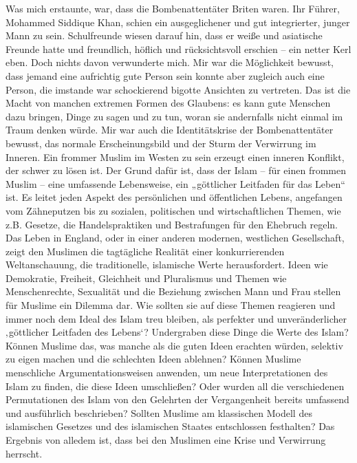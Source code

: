 \documentclass[12pt]{memoir}
\begin{document}
Was mich erstaunte, war, dass die Bombenattentäter Briten waren.
Ihr Führer, Mohammed Siddique Khan,
schien ein ausgeglichener und gut integrierter, junger Mann zu sein.
Schulfreunde wiesen darauf hin, dass er weiße und asiatische Freunde hatte
und freundlich, höflich und rücksichtsvoll erschien – ein netter Kerl eben.
Doch nichts davon verwunderte mich.
Mir war die Möglichkeit bewusst,
dass jemand eine aufrichtig gute Person sein konnte
aber zugleich auch eine Person,
die imstande war schockierend bigotte Ansichten zu vertreten.
Das ist die Macht von manchen extremen Formen des Glaubens:
es kann gute Menschen dazu bringen, Dinge zu sagen und zu tun,
woran sie andernfalls nicht einmal im Traum denken würde.
Mir war auch die Identitätskrise der Bombenattentäter bewusst,
das normale Erscheinungsbild und der Sturm der Verwirrung im Inneren.
Ein frommer Muslim im Westen zu sein erzeugt einen inneren Konflikt,
der schwer zu lösen ist.
Der Grund dafür ist, dass der Islam –
für einen frommen Muslim – eine umfassende Lebensweise,
ein „göttlicher Leitfaden für das Leben“ ist.
Es leitet jeden Aspekt des persönlichen und öffentlichen Lebens,
angefangen vom Zähneputzen bis zu sozialen, politischen
und wirtschaftlichen Themen, wie z.B. Gesetze, die Handelspraktiken
und Bestrafungen für den Ehebruch regeln.
Das Leben in England, oder in einer anderen modernen, westlichen Gesellschaft,
zeigt den Muslimen die tagtägliche Realität
einer konkurrierenden Weltanschauung,
die traditionelle, islamische Werte herausfordert.
Ideen wie Demokratie, Freiheit, Gleichheit und Pluralismus
und Themen wie Menschenrechte, Sexualität und die Beziehung
zwischen Mann und Frau stellen für Muslime ein Dilemma dar.
Wie sollten sie auf diese Themen reagieren und immer noch
dem Ideal des Islam treu bleiben,
als perfekter und unveränderlicher ‚göttlicher Leitfaden des Lebens‘?
Undergraben diese Dinge die Werte des Islam?
Können Muslime das, was manche als die guten Ideen erachten würden,
selektiv zu eigen machen und die schlechten Ideen ablehnen?
Können Muslime menschliche Argumentationsweisen anwenden,
um neue Interpretationen des Islam zu finden, die diese Ideen umschließen?
Oder wurden all die verschiedenen Permutationen des Islam
von den Gelehrten der Vergangenheit bereits
umfassend und ausführlich beschrieben?
Sollten Muslime am klassischen Modell des islamischen Gesetzes
und des islamischen Staates entschlossen festhalten?
Das Ergebnis von alledem ist,
dass bei den Muslimen eine Krise und Verwirrung herrscht.
\end{document}
